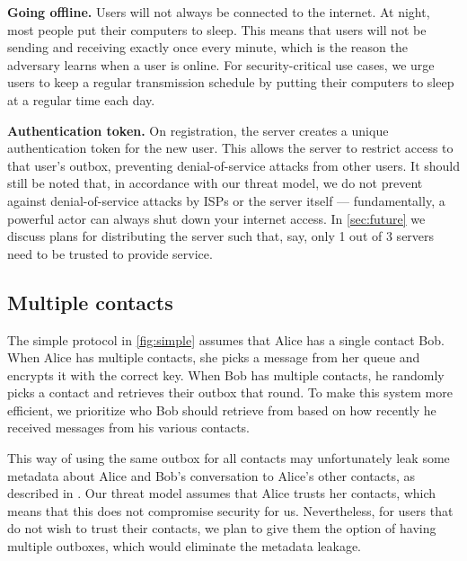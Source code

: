 
\textbf{Going offline.} Users will not always be connected to the internet. At night, most people put their computers to sleep. This means that users will not be sending and receiving exactly once every minute, which is the reason the adversary learns when a user is online. For security-critical use cases, we urge users to keep a regular transmission schedule by putting their computers to sleep at a regular time each day.

\textbf{Authentication token.} 
On registration, the server creates a unique authentication token for the new user. This allows the server to restrict access to that user's outbox, preventing denial-of-service attacks from other users. It should still be noted that, in accordance with our threat model, we do not prevent against denial-of-service attacks by ISPs or the server itself — fundamentally, a powerful actor can always shut down your internet access. In \cref{sec:future} we discuss plans for distributing the server such that, say, only 1 out of 3 servers need to be trusted to provide service.



\subsection{Multiple contacts}

The simple protocol in \cref{fig:simple} assumes that Alice has a single contact Bob. When Alice has multiple contacts, she picks a message from her queue and encrypts it with the correct key. When Bob has multiple contacts, he randomly picks a contact and retrieves their outbox that round. To make this system more efficient, we prioritize who Bob should retrieve from based on how recently he received messages from his various contacts. 

This way of using the same outbox for all contacts may unfortunately leak some metadata about Alice and Bob's conversation to Alice's other contacts, as described in \cite{angel2018s}. Our threat model assumes that Alice trusts her contacts, which means that this does not compromise security for us. Nevertheless, for users that do not wish to trust their contacts, we plan to give them the option of having multiple outboxes, which would eliminate the metadata leakage.

